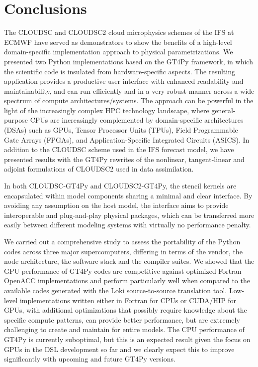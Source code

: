 \documentclass[main.tex]{subfiles}
\begin{document}
    \justifying

    \section{Conclusions}
    \label{section:conclusions} 

        The CLOUDSC and CLOUDSC2 cloud microphysics schemes of the IFS at ECMWF have served as demonstrators to show the benefits of a high-level domain-specific implementation approach to physical parametrizations. We presented two Python implementations based on the GT4Py framework, in which the scientific code is insulated from hardware-specific aspects. The resulting application provides a productive user interface with enhanced readability and maintainability, and can run efficiently and in a very robust manner across a wide spectrum of compute architectures/systems. The approach can be powerful in the light of the increasingly complex HPC technology landscape, where general-purpose CPUs are increasingly complemented by domain-specific architectures (DSAs) such as GPUs, Tensor Processor Units (TPUs), Field Programmable Gate Arrays (FPGAs), and Application-Specific Integrated Circuits (ASICS). In addition to the CLOUDSC scheme used in the IFS forecast model, we have presented results with the GT4Py rewrites of the nonlinear, tangent-linear and adjoint formulations of CLOUDSC2 used in data assimilation. 
    
        In both CLOUDSC-GT4Py and CLOUDSC2-GT4Py, the stencil kernels are encapsulated within model components sharing a minimal and clear interface. By avoiding any assumption on the host model, the interface aims to provide interoperable and plug-and-play physical packages, which can be transferred more easily between different modeling systems with virtually no performance penalty.
        
        We carried out a comprehensive study to assess the portability of the Python codes across three major supercomputers, differing in terms of the vendor, the node architecture, the software stack and the compiler suites. We showed that the GPU performance of GT4Py codes are competitive against optimized Fortran OpenACC implementations and perform particularly well when compared to the available codes generated with the Loki source-to-source translation tool. Low-level implementations written either in Fortran for CPUs or CUDA/HIP for GPUs, with additional optimizations that possibly require knowledge about the specific compute patterns, can provide better performance, but are extremely challenging to create and maintain for entire models. The CPU performance of GT4Py is currently suboptimal, but this is an expected result given the focus on GPUs in the DSL development so far and we clearly expect this to improve significantly with upcoming and future GT4Py versions. 
        
\end{document}
